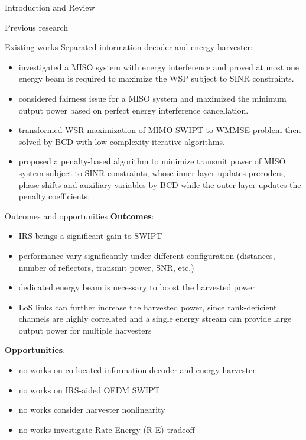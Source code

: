\documentclass[9pt]{beamer}
\begin{document}
\begin{section}{Introduction and Review}
	\begin{subsection}{Previous research}
		\begin{frame}{Existing works}
			Separated information decoder and energy harvester:
			\begin{itemize}
				\item \cite{Wu2019b} investigated a MISO system with energy interference and proved at most one energy beam is required to maximize the WSP subject to SINR constraints.
				\item \cite{Tang2019} considered fairness issue for a MISO system and maximized the minimum output power based on perfect energy interference cancellation.
				\item \cite{Pan2019a} transformed WSR maximization of MIMO SWIPT to WMMSE problem then solved by BCD with low-complexity iterative algorithms.
				\item \cite{Wu2019c} proposed a penalty-based algorithm to minimize transmit power of MISO system subject to SINR constraints, whose inner layer updates precoders, phase shifts and auxiliary variables by BCD while the outer layer updates the penalty coefficients.
			\end{itemize}
		\end{frame}

		\begin{frame}{Outcomes and opportunities}
			\textbf{Outcomes}:
			\begin{itemize}
				\item IRS brings a significant gain to SWIPT
				\item performance vary significantly under different configuration (distances, number of reflectors, transmit power, SNR, etc.)
				\item dedicated energy beam is necessary to boost the harvested power
				\item LoS links can further increase the harvested power, since rank-deficient channels are highly correlated and a single energy stream can provide large output power for multiple harvesters
			\end{itemize}
			\vspace{1em}
			\textbf{Opportunities}:
			\begin{itemize}
				\item no works on co-located information decoder and energy harvester
				\item no works on IRS-aided OFDM SWIPT
				\item no works consider harvester nonlinearity
				\item no works investigate Rate-Energy (R-E) tradeoff
			\end{itemize}
		\end{frame}
	\end{subsection}
\end{section}
\end{document}
